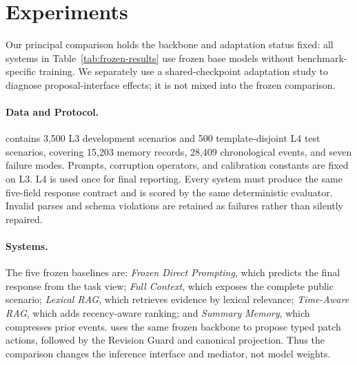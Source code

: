 \section{Experiments}

Our principal comparison holds the backbone and adaptation status fixed: all systems in Table~\ref{tab:frozen-results} use frozen base models without benchmark-specific training. We separately use a shared-checkpoint adaptation study to diagnose proposal-interface effects; it is not mixed into the frozen comparison.

\paragraph{Data and Protocol.}
\bench{} contains 3,500 L3 development scenarios and 500 template-disjoint L4 test scenarios, covering 15,203 memory records, 28,409 chronological events, and seven failure modes. Prompts, corruption operators, and calibration constants are fixed on L3. L4 is used once for final reporting. Every system must produce the same five-field response contract and is scored by the same deterministic evaluator. Invalid parses and schema violations are retained as failures rather than silently repaired.

\paragraph{Systems.}
The five frozen baselines are: \emph{Frozen Direct Prompting}, which predicts the final response from the task view; \emph{Full Context}, which exposes the complete public scenario; \emph{Lexical RAG}, which retrieves evidence by lexical relevance; \emph{Time-Aware RAG}, which adds recency-aware ranking; and \emph{Summary Memory}, which compresses prior events. \method{} uses the same frozen backbone to propose typed patch actions, followed by the Revision Guard and canonical projection. Thus the comparison changes the inference interface and mediator, not model weights.

